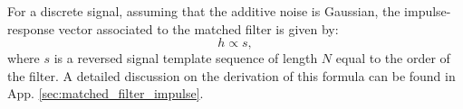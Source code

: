 For a discrete signal, assuming that the additive noise is Gaussian, the impulse-response vector associated to the matched filter is given by:
\begin{equation}
	h \propto s,
\end{equation}
where $s$ is a reversed signal template sequence of length $N$ equal to the order of the filter. A detailed discussion on the derivation of this formula can be found in App. \ref{sec:matched_filter_impulse}.

